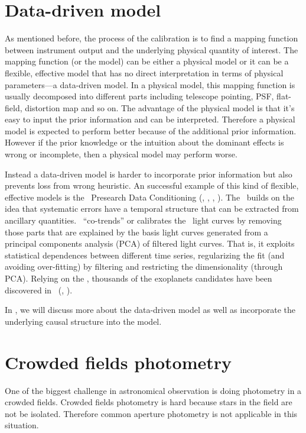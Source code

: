 \section{Data-driven model}
As mentioned before, the process of the calibration is to find a mapping function between instrument output and the underlying physical quantity of interest.
The mapping function (or the model) can be either a physical model or it can be a flexible, effective model that has no direct interpretation in terms of physical parameters---a data-driven model.
In a physical model, this mapping function is usually decomposed into different parts including telescope pointing, PSF, flat-field, distortion map and so on.
The advantage of the physical model is that it's easy to input the prior information and can be interpreted.
Therefore a physical model is expected to perform better because of the additional prior information.
However if the prior knowledge or the intuition about the dominant effects is wrong or incomplete, then a physical model may perform worse.

Instead a data-driven model is harder to incorporate prior information but also prevents loss from wrong heuristic. 
An successful example of this kind of flexible, effective models is the \kepler\ Presearch Data Conditioning (\pdc, \citealt{pdc1}, \citealt{pdc2}, \citealt{pdc3}). 
The \pdc\ builds on the idea that systematic errors have a temporal structure that can be extracted from ancillary quantities.
\pdc\ ``co-trends'' or calibrates the \kepler\ light curves by removing those parts that are explained by the basis light curves generated from a principal components analysis (PCA) of filtered light curves.
That is, it exploits statistical dependences between different time series, regularizing the fit (and avoiding over-fitting) by filtering and restricting the dimensionality (through PCA).
Relying on the \pdc, thousands of the exoplanets candidates have been discovered in \kepler\ (\citealt{kepler}, \citealt{kepler1}).

In , we will discuss more about the data-driven model as well as incorporate the underlying causal structure into the model.

\section{Crowded fields photometry}
One of the biggest challenge in astronomical observation is doing photometry in a crowded fields.
Crowded fields photometry is hard because stars in the field are not be isolated.
Therefore common aperture photometry is not applicable in this situation.

